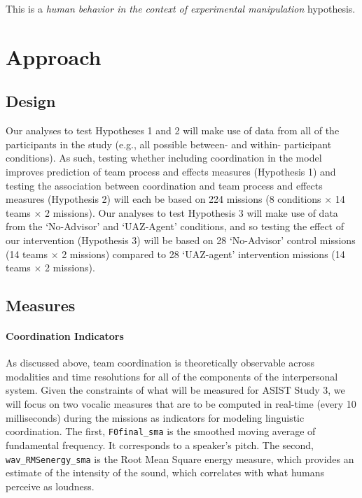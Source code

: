 \noindent This is a
\textit{human behavior in the context of experimental manipulation} hypothesis.

\section{Approach}

\subsection{Design}

Our analyses to test Hypotheses 1 and 2 will make use of data from all of the
participants in the study (e.g., all possible between- and within- participant
conditions). As such, testing whether including coordination in the model
improves prediction of team process and effects measures (Hypothesis 1) and
testing the association between coordination and team process and effects
measures (Hypothesis 2) will each be based on 224 missions (8 conditions
$\times$ 14 teams $\times$ 2 missions). Our analyses to test Hypothesis 3 will
make use of data from the `No-Advisor' and `UAZ-Agent' conditions, and so
testing the effect of our intervention (Hypothesis 3) will be based on 28
`No-Advisor' control missions (14 teams $\times$ 2 missions) compared to 28
`UAZ-agent' intervention missions (14 teams $\times$ 2 missions).

\subsection{Measures}
\label{subsec:measures}

\paragraph{Coordination Indicators} As discussed above, team coordination is
theoretically observable across modalities and time resolutions for all of the
components of the interpersonal system. Given the constraints of what will be
measured for ASIST Study 3, we will focus on two vocalic measures that are to
be computed in real-time (every 10 milliseconds) during the missions as
indicators for modeling linguistic coordination. The first,
\texttt{F0final\_sma} is the smoothed moving average of fundamental frequency.
It corresponds to a speaker’s pitch.  The second, \texttt{wav\_RMSenergy\_sma}
is the Root Mean Square energy measure, which provides an estimate of the
intensity of the sound, which correlates with what humans perceive as loudness.

